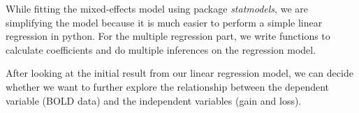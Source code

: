 While fitting the mixed-effects model using package \emph{statmodels}, we 
are simplifying the model because it is much easier to perform a simple 
linear regression in python. For the multiple regression part, we write functions 
to calculate coefficients and do multiple inferences on the regression model.

After looking at the initial result from our linear regression model, we can 
decide whether we want to further explore the relationship between the 
dependent variable (BOLD data) and the independent variables (gain and loss).
